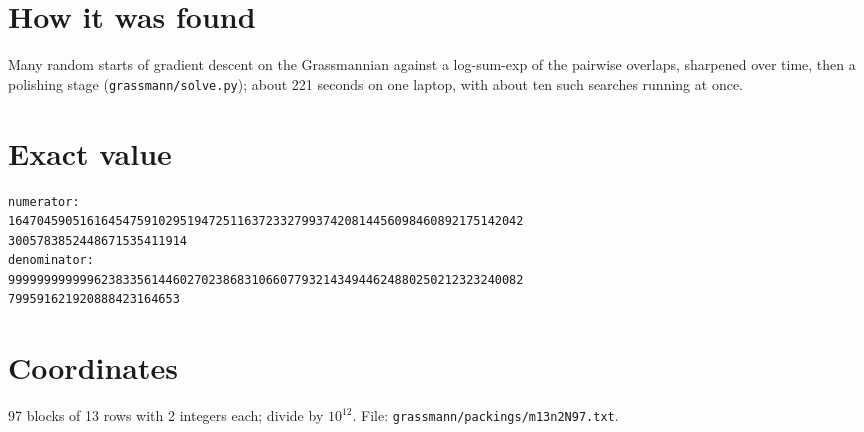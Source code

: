 \documentclass[11pt,a4paper]{article}
\begin{document}
\section{How it was found}
Many random starts of gradient descent on the Grassmannian against a log-sum-exp of the pairwise overlaps, sharpened over time, then a polishing stage (\texttt{grassmann/solve.py}); about 221 seconds on one laptop, with about ten such searches running at once.


\appendix
\section{Exact value}
{\small
\begin{verbatim}
numerator:
164704590516164547591029519472511637233279937420814456098460892175142042
3005783852448671535411914
denominator:
999999999999623833561446027023868310660779321434944624880250212323240082
799591621920888423164653
\end{verbatim}}

\section{Coordinates}
97 blocks of 13 rows with 2 integers each; divide by $10^{12}$. File: \texttt{grassmann/packings/m13n2N97.txt}.
{\tiny
\begin{multicols}{4}
\end{multicols}}
\end{document}
